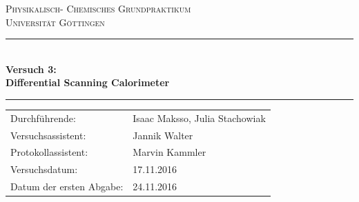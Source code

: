 \documentclass[12pt,a4paper,titlepage,headinclude,bibtotoc]{scrartcl}
\begin{document}
\begin{titlepage}
\centering
\textsc{\Large Physikalisch- Chemisches Grundpraktikum\\[1.5ex] Universität Göttingen}

\vspace*{0.5cm}

\rule{\textwidth}{1pt}\\[0.5cm]
{\huge \bfseries
  Versuch 3: \\[1.5ex]
  Differential Scanning Calorimeter}\\[0.5cm]
\rule{\textwidth}{1pt}

\vspace*{0.5cm}


\begin{Large}
\begin{tabular}{ll}
Durchführende: &  Isaac Maksso, Julia Stachowiak\\
Versuchsassistent: & Jannik Walter \\
Protokollassistent:& Marvin Kammler\\
 Versuchsdatum: & 17.11.2016\\
 Datum der ersten Abgabe: & 24.11.2016\\
\end{tabular}
\end{Large}

\vspace*{0.5cm}




\vspace{1.3cm} 
\end{titlepage}


\tableofcontents %
\newpage
\end{document}
